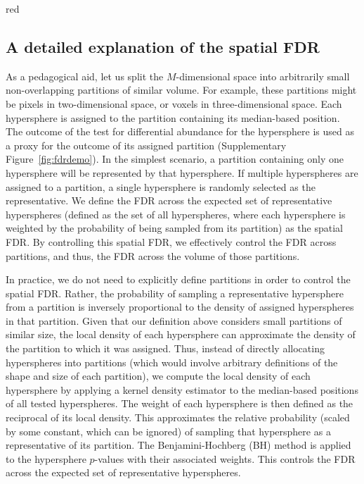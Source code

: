 \documentclass{article}
\begin{document}
\begin{color}{red}
\subsection{A detailed explanation of the spatial FDR}
As a pedagogical aid, let us split the $M$-dimensional space into arbitrarily small non-overlapping partitions of similar volume.
For example, these partitions might be pixels in two-dimensional space, or voxels in three-dimensional space.
Each hypersphere is assigned to the partition containing its median-based position.
The outcome of the test for differential abundance for the hypersphere is used as a proxy for the outcome of its assigned partition (Supplementary Figure~\ref{fig:fdrdemo}).
In the simplest scenario, a partition containing only one hypersphere will be represented by that hypersphere.
If multiple hyperspheres are assigned to a partition, a single hypersphere is randomly selected as the representative.
We define the FDR across the expected set of representative hyperspheres (defined as the set of all hyperspheres, where each hypersphere is weighted by the probability of being sampled from its partition) as the spatial FDR.
By controlling this spatial FDR, we effectively control the FDR across partitions, and thus, the FDR across the volume of those partitions.

In practice, we do not need to explicitly define partitions in order to control the spatial FDR.
Rather, the probability of sampling a representative hypersphere from a partition is inversely proportional to the density of assigned hyperspheres in that partition.
Given that our definition above considers small partitions of similar size, the local density of each hypersphere can approximate the density of the partition to which it was assigned.
Thus, instead of directly allocating hyperspheres into partitions (which would involve arbitrary definitions of the shape and size of each partition), we compute the local density of each hypersphere by applying a kernel density estimator to the median-based positions of all tested hyperspheres.
The weight of each hypersphere is then defined as the reciprocal of its local density.
This approximates the relative probability (scaled by some constant, which can be ignored) of sampling that hypersphere as a representative of its partition.
The Benjamini-Hochberg (BH) method is applied to the hypersphere $p$-values with their associated weights.
This controls the FDR across the expected set of representative hyperspheres.


\end{color}
\end{document}
